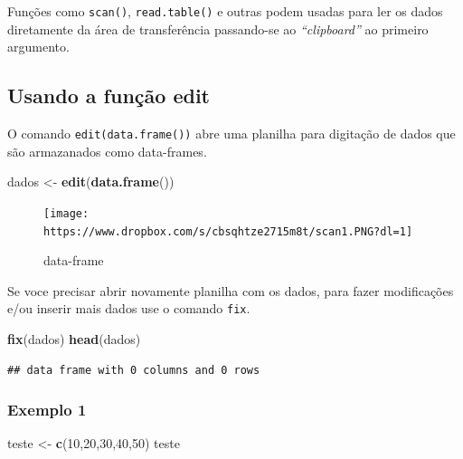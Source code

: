 \documentclass[]{book}
\newenvironment{Shaded}{\begin{snugshade}}{\end{snugshade}}
\newcommand{\DecValTok}[1]{\textcolor[rgb]{0.00,0.00,0.81}{#1}}
\newcommand{\KeywordTok}[1]{\textcolor[rgb]{0.13,0.29,0.53}{\textbf{#1}}}
\newcommand{\NormalTok}[1]{#1}
\newcommand{\StringTok}[1]{\textcolor[rgb]{0.31,0.60,0.02}{#1}}
\begin{document}
Funções como \texttt{scan()}, \texttt{read.table()} e outras podem usadas para ler os dados diretamente da área de transferência passando-se ao \emph{``clipboard''} ao primeiro argumento.

\hypertarget{usando-a-funcao-edit}{%
\subsection{Usando a função edit}\label{usando-a-funcao-edit}}

O comando \texttt{edit(data.frame())} abre uma planilha para digitação de dados que são armazanados como data-frames.

\begin{Shaded}
\begin{Highlighting}[]
\NormalTok{dados <-}\StringTok{ }\KeywordTok{edit}\NormalTok{(}\KeywordTok{data.frame}\NormalTok{())}
\end{Highlighting}
\end{Shaded}

\begin{figure}
\centering
\texttt{[image: https://www.dropbox.com/s/cbsqhtze2715m8t/scan1.PNG?dl=1]}
\caption{data-frame}
\end{figure}

Se voce precisar abrir novamente planilha com os dados, para fazer modificações e/ou inserir mais dados use o comando \texttt{fix}.

\begin{Shaded}
\begin{Highlighting}[]
\KeywordTok{fix}\NormalTok{(dados)}
\KeywordTok{head}\NormalTok{(dados)}
\end{Highlighting}
\end{Shaded}

\begin{verbatim}
## data frame with 0 columns and 0 rows
\end{verbatim}

\hypertarget{exemplo-1}{%
\subsubsection{Exemplo 1}\label{exemplo-1}}

\begin{Shaded}
\begin{Highlighting}[]
\NormalTok{teste <-}\StringTok{ }\KeywordTok{c}\NormalTok{(}\DecValTok{10}\NormalTok{,}\DecValTok{20}\NormalTok{,}\DecValTok{30}\NormalTok{,}\DecValTok{40}\NormalTok{,}\DecValTok{50}\NormalTok{)}
\NormalTok{teste}
\end{Highlighting}
\end{Shaded}
\end{document}
